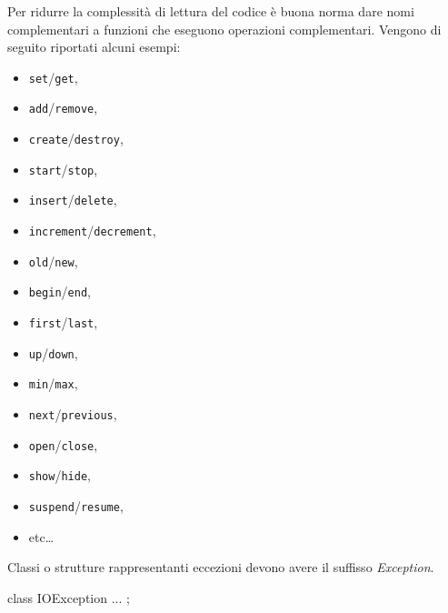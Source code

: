 Per ridurre la complessità di lettura del codice è buona norma dare nomi complementari a funzioni che eseguono operazioni complementari.
Vengono di seguito riportati alcuni esempi:
\begin{itemize}
	\item \texttt{set}/\texttt{get},
	\item \texttt{add}/\texttt{remove},
	\item \texttt{create}/\texttt{destroy}, 
	\item \texttt{start}/\texttt{stop},
	\item \texttt{insert}/\texttt{delete},
	\item \texttt{increment}/\texttt{decrement},
	\item \texttt{old}/\texttt{new},
	\item \texttt{begin}/\texttt{end},
	\item \texttt{first}/\texttt{last},
	\item \texttt{up}/\texttt{down},
	\item \texttt{min}/\texttt{max},
	\item \texttt{next}/\texttt{previous},
	\item \texttt{open}/\texttt{close},
	\item \texttt{show}/\texttt{hide},
	\item \texttt{suspend}/\texttt{resume},
	\item etc\dots
\end{itemize}

Classi o strutture rappresentanti eccezioni devono avere il suffisso \emph{Exception}.

\noindent\begin{minipage}[t]{\rbwidth}
\begin{RightCode}
class IOException
{
	...
};
\end{RightCode}
\end{minipage}%
